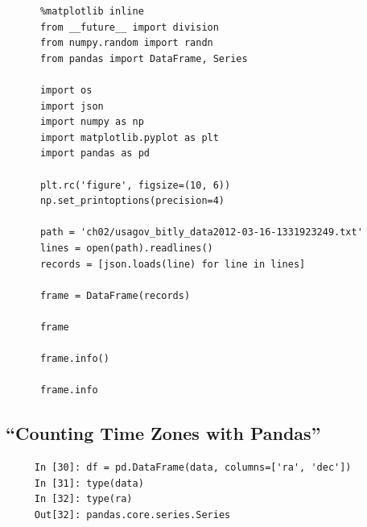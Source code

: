 \documentclass[11pt,a4paper]{article}
\begin{document}
    \begin{lstlisting}
      %matplotlib inline
      from __future__ import division
      from numpy.random import randn
      from pandas import DataFrame, Series
      
      import os
      import json
      import numpy as np
      import matplotlib.pyplot as plt
      import pandas as pd
      
      plt.rc('figure', figsize=(10, 6))
      np.set_printoptions(precision=4)
      
      path = 'ch02/usagov_bitly_data2012-03-16-1331923249.txt'
      lines = open(path).readlines()
      records = [json.loads(line) for line in lines]

      frame = DataFrame(records)

      frame

      frame.info()

      frame.info

    \end{lstlisting}


    \subsection{``Counting Time Zones with Pandas''}
    \begin{lstlisting}
     In [30]: df = pd.DataFrame(data, columns=['ra', 'dec']) 
     In [31]: type(data)
     In [32]: type(ra)
     Out[32]: pandas.core.series.Series
    \end{lstlisting}


    
\end{document}
